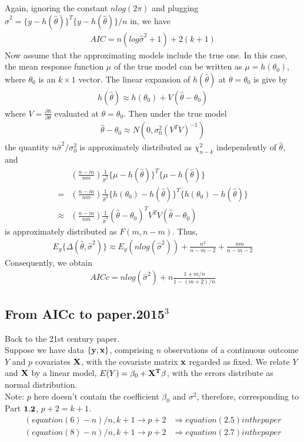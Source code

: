 \documentclass{article}
\begin{document}
Again, ignoring the constant $n log(2\pi)$ and plugging $\hat{\sigma}^2=\{y-h(\hat{\theta})\}^T\{y-h(\hat{\theta})\}/n$ in, we have
\begin{align}
AIC=n(log \hat{\sigma}^2+1)+2(k+1)
\end{align}
Now assume that the approximating models include the true one. In this case, the mean response function $\mu$ of the true model can be written as $\mu=h(\theta_0)$, where $\theta_0$ is an $k\times 1$ vector. The linear expansion of $h(\hat{\theta})$ at $\theta=\theta_0$ is give by
\begin{align*}
h(\hat{\theta})\approx h(\theta_0)+V(\hat{\theta}-\theta_0)
\end{align*}
where $V=\frac{\partial h}{\partial \theta}$ evaluated at $\theta=\theta_0$. Then under the true model
\begin{align}
\hat{\theta}-\theta_0 \approx N(0, \sigma_0^2(V^TV)^{-1})
\end{align}
the quantity $n\hat{\sigma}^2/\sigma_0^2$ is approximately distributed as $\chi _{n-k}^2$ independently of $\hat{\theta}$, and
\begin{align*}
&(\frac{n-m}{nm})\frac{1}{\hat{\sigma}^2}\{\mu-h(\hat{\theta})\}^T\{\mu-h(\hat{\theta})\}\\=&(\frac{n-m}{nm})\frac{1}{\hat{\sigma}^2}\{h(\theta_0)-h(\hat{\theta})\}^T\{h(\theta_0)-h(\hat{\theta})\}\\ \approx & (\frac{n-m}{nm})\frac{1}{\hat{\sigma}^2}(\hat{\theta}-\theta_0)^TV^TV(\hat{\theta}-\theta_0)
\end{align*}
is approximately distributed as $F(m, n-m)$. Thus,
\begin{align*}
E_g\{\Delta(\hat{\theta}, \hat{\sigma}^2)\} \approx E_g(n log(\hat{\sigma}^2))+\frac{n^2}{n-m-2}+\frac{nm}{n-m-2}
\end{align*}
Consequently, we obtain
\begin{align}
AICc=n log(\hat{\sigma}^2)+n\frac{1+m/n}{1-(m+2)/n}
\end{align}

\subsection{From AICc to paper.2015$^{3}$}
Back to the 21st century paper.\\
Suppose we have data $\{\bf{y, x}\}$, comprising $n$ observations of a continuous outcome $Y$ and $p$ covariates $\bf{X}$, with the covariate matrix $\bf{x}$ regarded as fixed. We relate $Y$ and $\bf{X}$ by a linear model, $E(Y)=\beta_0+\bf{X}^T\bf{\beta}$, with the errors distribute as normal distribution.\\
Note: $p$ here doesn't contain the coefficient $\beta_0$ and $\sigma^2$, therefore, corresponding to Part $\bf{1.2}$, $p+2=k+1$.\\
\begin{align*}
(equation(6)-n)/n, k+1\rightarrow p+2&\Rightarrow equation(2.5) in the paper\\
(equation(8)-n)/n, k+1\rightarrow p+2&\Rightarrow equation(2.7) in the paper
\end{align*}
\end{document}
